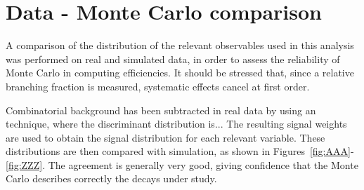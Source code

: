 % 

\section{Data - Monte Carlo comparison}
\label{sec:dataMCcomparison}

A comparison of the distribution of the relevant observables used in this analysis was performed on real and simulated data, in order to assess the reliability of Monte Carlo in 
computing efficiencies. It should be stressed that, since a relative branching fraction is measured, systematic effects cancel at first order. 

Combinatorial background has been subtracted in real data by using an \sPlot technique, where the discriminant distribution is... The resulting signal weights are used to obtain the signal 
distribution for each relevant variable. These distributions are then compared with simulation, as shown in Figures~\ref{fig:AAA}-\ref{fig:ZZZ}. The agreement is generally very good, 
giving confidence that the Monte Carlo describes correctly the decays under study.  